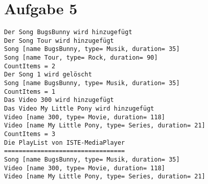 \section*{Aufgabe 5}
\texttt{\noindent Der Song BugsBunny wird hinzugefügt\\
Der Song Tour wird hinzugefügt\\
Song [name BugsBunny, type= Musik, duration= 35]\\
Song [name Tour, type= Rock, duration= 90]\\
CountItems = 2\\
Der Song 1 wird gelöscht\\
Song [name BugsBunny, type= Musik, duration= 35]\\
CountItems = 1\\
Das Video 300 wird hinzugefügt\\
Das Video My Little Pony wird hinzugefügt\\
Video [name 300, type= Movie, duration= 118]\\
Video [name My Little Pony, type= Series, duration= 21]\\
CountItems = 3\\
Die PlayList von ISTE-MediaPlayer\\
=================================\\
Song [name BugsBunny, type= Musik, duration= 35]\\
Video [name 300, type= Movie, duration= 118]\\
Video [name My Little Pony, type= Series, duration= 21] }
